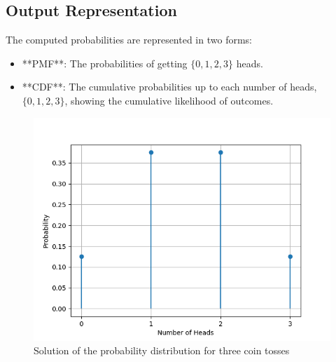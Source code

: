 \documentclass[article]{IEEEtran}
\numberwithin{figure}{enumi}
\begin{document}
\subsection*{Output Representation}
The computed probabilities are represented in two forms:
\begin{itemize}
    \item **PMF**: The probabilities of getting $ \{0, 1, 2, 3\} $ heads.
    \item **CDF**: The cumulative probabilities up to each number of heads, $ \{0, 1, 2, 3\} $, showing the cumulative likelihood of outcomes.
\end{itemize}
    \begin{figure}[h!]
        \centering
        \includegraphics[width=\columnwidth]{figs/fig2.png}
        \caption{Solution of the probability distribution for three coin tosses}
        \label{stemplot2}
    \end{figure}
\end{document}
